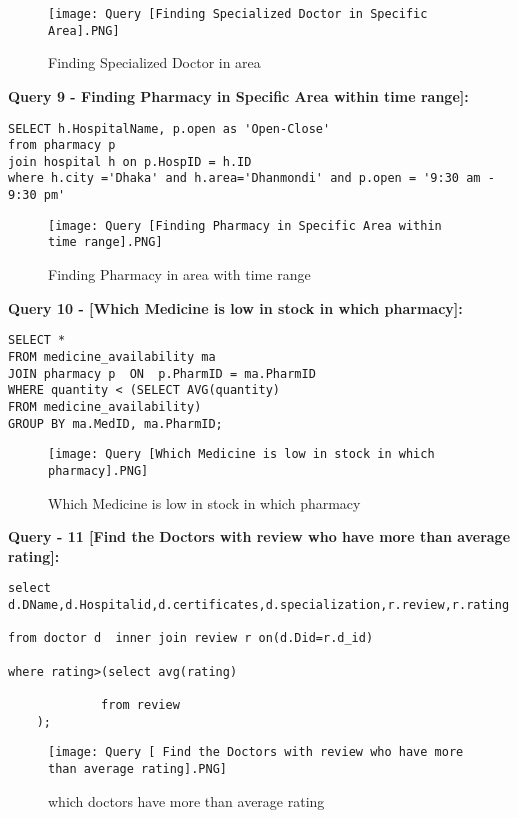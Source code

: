 \documentclass[11pt]{article}
\begin{document}
\begin{figure}[H]
    \centering
    \texttt{[image: Query [Finding Specialized Doctor in Specific Area].PNG]}
    \caption{Finding Specialized Doctor in area}
    \label{fig:1}
\end{figure}


\textbf{Query 9 - Finding Pharmacy in Specific Area within time range]:}
\begin{lstlisting}
SELECT h.HospitalName, p.open as 'Open-Close'
from pharmacy p 
join hospital h on p.HospID = h.ID 
where h.city ='Dhaka' and h.area='Dhanmondi' and p.open = '9:30 am - 9:30 pm'
\end{lstlisting}

\begin{figure}[H]
    \centering
    \texttt{[image: Query [Finding Pharmacy in Specific Area within time range].PNG]}
    \caption{Finding Pharmacy in area with time range}
    \label{fig:1}
\end{figure}



\textbf{Query 10  - [Which Medicine is low in stock in which pharmacy]:}
\begin{lstlisting}
SELECT * 
FROM medicine_availability ma 
JOIN pharmacy p  ON  p.PharmID = ma.PharmID 
WHERE quantity < (SELECT AVG(quantity) 
FROM medicine_availability) 
GROUP BY ma.MedID, ma.PharmID; 
\end{lstlisting}

\begin{figure}[H]
    \centering
    \texttt{[image: Query [Which Medicine is low in stock in which pharmacy].PNG]}
    \caption{Which Medicine is low in stock in which pharmacy}
    \label{fig:1}
\end{figure}


\textbf{Query - 11 [Find the Doctors with review who have more than average rating]:}
\begin{lstlisting}
select d.DName,d.Hospitalid,d.certificates,d.specialization,r.review,r.rating 

from doctor d  inner join review r on(d.Did=r.d_id) 

where rating>(select avg(rating) 

			 from review 
    ); 
\end{lstlisting}

\begin{figure}[H]
    \centering
    \texttt{[image: Query [ Find the Doctors with review who have more than average rating].PNG]}
    \caption{which doctors have more than average rating}
    \label{fig:1}
\end{figure}
\end{document}
